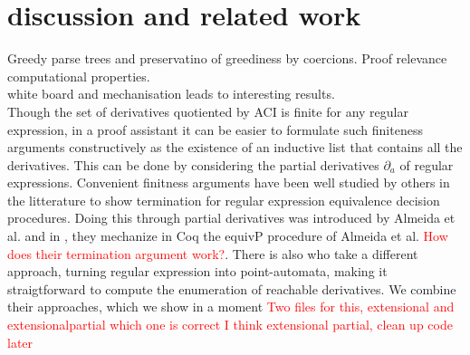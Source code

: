 \documentclass[a4paper,UKenglish,cleveref, autoref, thm-restate]{lipics-v2021}
\newcommand\mycomment[1]{\textcolor{red}{#1}}
\begin{document}
\section{discussion and related work}
Greedy parse trees and preservatino of greediness by coercions. Proof relevance computational properties.\\
white board and mechanisation leads to interesting results.
\\
Though the set of derivatives quotiented by ACI is finite for any regular expression, in a proof assistant it can be easier to formulate such finiteness arguments constructively as the existence of an inductive list that contains all the derivatives. This can be done by considering the partial derivatives $\partial_a$ of regular expressions. Convenient finitness arguments have been well studied by others in the litterature to show termination for regular expression equivalence decision procedures. Doing this through partial derivatives was introduced by Almeida et al. \cite{AMR09} and in \cite{MPS12}, they mechanize in Coq the \textsf{equivP} procedure of Almeida et al. \mycomment{How does their termination argument work?}. There is also \cite{A12} who take a different approach, turning regular expression into point-automata, making it straigtforward to compute the enumeration of reachable derivatives. We combine their approaches, which we show in a moment
\mycomment{Two files for this, extensional and extensionalpartial which one is correct I think extensional partial, clean up code later}\\
  
\end{document}
